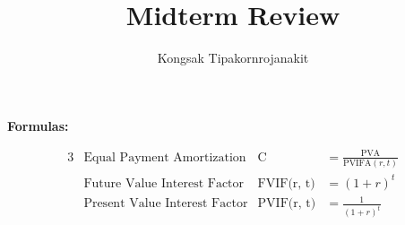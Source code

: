 \documentclass{article}
\begin{document}
\title{Midterm Review}
\author{Kongsak Tipakornrojanakit}
\date{}
\maketitle


\textbf{Formulas:}


\begin{alignat}{3}
	\label{EPA}		&\mbox{Equal Payment Amortization} 		&\mbox{C} 			&=  \frac{\mbox{PVA}}{\mbox{PVIFA}(r, t)}\\
	\label{FVIF}	&\mbox{Future Value Interest Factor} 	&\mbox{FVIF(r, t)} 	&=  (1 + r)^t\\ 
	\label{PVIF}	&\mbox{Present Value Interest Factor} 	&\mbox{PVIF(r, t)} 	&=  \frac{1}{(1 + r)^t}
\end{alignat}
\end{document}
